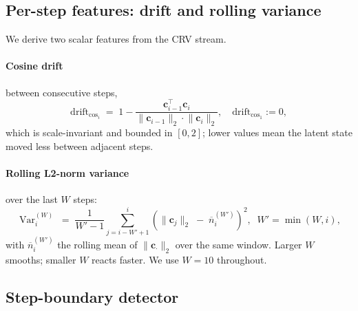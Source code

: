 \documentclass[11pt,letterpaper]{article}
\newcommand{\drift}{\mathrm{drift}_{\cos}}
\newcommand{\Var}{\operatorname{Var}}
\begin{document}
\subsection{Per-step features: drift and rolling variance}
\label{sec:method-features}

We derive two scalar features from the CRV stream.
\paragraph{Cosine drift} between consecutive steps,
\begin{equation}
\drift_i \;=\; 1 - \frac{\mathbf{c}_{i-1}^\top \mathbf{c}_i}
{\lVert \mathbf{c}_{i-1}\rVert_2 \cdot \lVert \mathbf{c}_i \rVert_2},
\quad
\drift_1 := 0,
\label{eq:drift}
\end{equation}
which is scale-invariant and bounded in $[0, 2]$; lower values mean the
latent state moved less between adjacent steps.
\paragraph{Rolling L2-norm variance} over the last $W$ steps:
\begin{equation}
\Var_i^{(W)} \;=\;
\frac{1}{W'-1} \sum_{j = i - W' + 1}^{i}
\left(
\lVert \mathbf{c}_j \rVert_2 \;-\; \overline{n}_i^{(W')}
\right)^{2},
\;\;
W' = \min(W, i),
\label{eq:variance}
\end{equation}
with $\overline{n}_i^{(W')}$ the rolling mean of $\lVert \mathbf{c}_\cdot
\rVert_2$ over the same window. Larger $W$ smooths; smaller $W$ reacts
faster. We use $W = 10$ throughout.


\subsection{Step-boundary detector}
\label{sec:method-boundaries}
\end{document}
